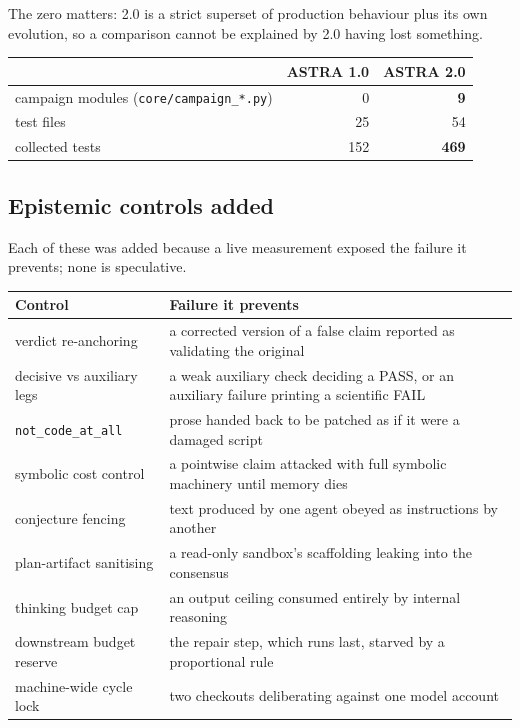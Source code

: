 \documentclass[11pt,a4paper]{article}
\newcommand{\code}[1]{\texttt{\small #1}}
\begin{document}
The zero matters: 2.0 is a strict superset of production behaviour plus its own
evolution, so a comparison cannot be explained by 2.0 having lost something.

\begin{center}
\small
\begin{tabular}{@{}lrr@{}}
\toprule
& \textbf{ASTRA 1.0} & \textbf{ASTRA 2.0} \\
\midrule
campaign modules (\code{core/campaign\_*.py}) & 0 & \textbf{9} \\
test files & 25 & 54 \\
collected tests & 152 & \textbf{469} \\
\bottomrule
\end{tabular}
\end{center}

\subsection{Epistemic controls added}

Each of these was added because a live measurement exposed the failure it
prevents; none is speculative.

\begin{center}
\small
\begin{tabular}{@{}p{4.6cm}p{9.6cm}@{}}
\toprule
\textbf{Control} & \textbf{Failure it prevents} \\
\midrule
verdict re-anchoring & a corrected version of a false claim reported as validating the original \\
decisive vs auxiliary legs & a weak auxiliary check deciding a PASS, or an auxiliary failure printing a scientific FAIL \\
\code{not\_code\_at\_all} & prose handed back to be patched as if it were a damaged script \\
symbolic cost control & a pointwise claim attacked with full symbolic machinery until memory dies \\
conjecture fencing & text produced by one agent obeyed as instructions by another \\
plan-artifact sanitising & a read-only sandbox's scaffolding leaking into the consensus \\
thinking budget cap & an output ceiling consumed entirely by internal reasoning \\
downstream budget reserve & the repair step, which runs last, starved by a proportional rule \\
machine-wide cycle lock & two checkouts deliberating against one model account \\
\bottomrule
\end{tabular}
\end{center}
\end{document}
